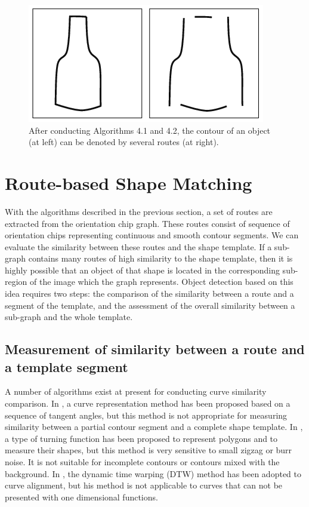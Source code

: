 \documentclass[journal]{IEEEtran}
\begin{document}
\begin{figure}[!t]
\centering
\includegraphics[width=0.4\linewidth]{images/fig11.png}
\caption{After conducting Algorithms 4.1 and 4.2, 
the contour of an object (at left) can be denoted by several routes (at right).}
\label{fig:11}
\end{figure}

\section{Route-based Shape Matching}

With the algorithms described in the previous section,
a set of routes are extracted from the orientation chip graph.
These routes consist of sequence of orientation chips representing continuous and smooth contour segments.
We can evaluate the similarity between these routes and the shape template. 
If a sub-graph contains many routes of high similarity to the shape template,
then it is highly possible that an object of that shape is located in the corresponding sub-region of the image which the graph represents. 
Object detection based on this idea requires two steps: 
the comparison of the similarity between a route and a segment of the template, 
and the assessment of the overall similarity between a sub-graph and the whole template.

\subsection{Measurement of similarity between a route and a template segment}

A number of algorithms exist at present for conducting curve similarity comparison. 
In \cite{schindler2008}, a curve representation method has been proposed based on a sequence of tangent angles,
but this method is not appropriate for measuring similarity between a partial contour segment and a complete shape template.
In \cite{arkin1991}, a type of turning function has been proposed to represent polygons and to measure their shapes, 
but this method is very sensitive to small zigzag or burr noise.
It is not suitable for incomplete contours or contours mixed with the background. 
In \cite{wang1997}, the dynamic time warping (DTW) method has been adopted to curve alignment,
but his method is not applicable to curves that can not be presented with one dimensional functions.
\end{document}

